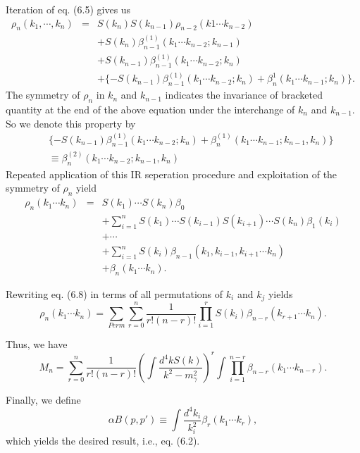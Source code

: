 Iteration of eq.   (6.5) gives us 
\begin{eqnarray}
\rho_n(k_1,\cdots,k_n) &=& S(k_n)S(k_{n-1})\rho_{n-2}(k1\cdots k_{n-2})\nonumber\\
&& + S(k_{n})\beta^{(1)}_{n-1}(k_1\cdots k_{n-2};k_{n-1})\nonumber\\
&& + S(k_{n-1})\beta^{(1)}_{n-1}(k_1\cdots k_{n-2};k_{n})\\
&& +\{-S(k_{n-1})\beta^{(1)}_{n-1}(k_1\cdots k_{n-2};k_{n}) +\beta^{1}_{n}(k_1\cdots k_{n-1};k_n)\}.\nonumber
\end{eqnarray}
The symmetry of $\rho_n$ in $k_n$ and $k_{n-1}$ indicates the invariance of bracketed quantity at the end of the above equation under the interchange of $k_n$ and $k_{n-1}$. So we denote this property by
\begin{eqnarray}
&&\{-S(k_{n-1})\beta^{(1)}_{n-1}(k_1\cdots k_{n-2};  k_n)+\beta^{(1)}_n(k_1\cdots k_{n-1}; k_{n-1}, k_n)\}\nonumber\\
&&\equiv \beta^{(2)}_n(k_1\cdots k_{n-2};k_{n-1},k_n)
\end{eqnarray}
Repeated application of this IR seperation procedure and exploitation of the symmetry of $\rho_n$ yield 
\begin{eqnarray}
\rho_n(k_1\cdots k_n) &=& S(k_1)\cdots S(k_n)\beta_0\nonumber\\
&& +\sum_{i=1}^{n}S(k_1)\cdots S(k_{i-1})S(k_{i+1})\cdots S(k_{n})\beta_1(k_i)\nonumber\\
&& + \cdots \nonumber\\
&& + \sum_{i=1}^{n}S(k_i)\beta_{n-1}(k_1,k_{i-1},k_{i+1}\cdots k_n)\nonumber\\
&& + \beta_n (k_1\cdots k_n).
\end{eqnarray}

Rewriting eq. (6.8) in terms of all permutations of $k_i$ and $k_j$ yields 
\begin{equation}
\rho_n(k_1\cdots k_n) = \sum_{Perm}\sum_{r=0}^{n}\frac{1}{r!(n-r)!}\prod_{i=1}^{r}S(k_i)\beta_{n-r}(k_{r+1}\cdots k_n).
\end{equation}

Thus, we have 
\begin{equation}
M_n = \sum_{r=0}^{n}\frac{1}{r!(n-r)!}\left(\int\frac{d^4 k S(k)}{k^2-m_{\gamma}^2}\right)^r\int\prod_{i=1}^{n-r}\beta_{n-r}(k_1\cdots k_{n-r}).
\end{equation}

Finally, we define 
\begin{equation}
\alpha B(p,p') \equiv \int \frac{d^4 k_i}{k_i^2}\beta_r(k_1\cdots k_r),
\end{equation}
which yields the desired result, i.e., eq. (6.2).

